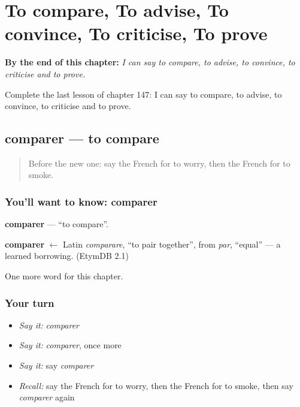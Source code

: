 
\chapter{To compare, To advise, To convince, To criticise, To prove}
\label{ch:fr-to-compare-to-advise-to-convince-to-criticise-to-prove}

\begin{chapteropening}
\textbf{By the end of this chapter:} \emph{I can say to compare, to advise, to convince, to criticise and to prove.}

Complete the last lesson of chapter 147: I can say to compare, to advise, to convince, to criticise and to prove.
\end{chapteropening}

\section[comparer]{comparer — to compare}

\label{lesson:FR-C147-comparer}



\begin{quote}
Before the new one: say the French for to worry, then the French for to smoke.
\end{quote}

\subsection*{You'll want to know: comparer}
\textbf{comparer} — \textquotedblleft{}to compare\textquotedblright{}.

\begin{cousinweb}
\textbf{comparer} $\leftarrow$ Latin \emph{comparare}, \textquotedblleft{}to pair together\textquotedblright{}, from \emph{par}, \textquotedblleft{}equal\textquotedblright{} — a learned borrowing. (EtymDB 2.1)
\end{cousinweb}

\begin{grammarlens}[title={What you've built}]
One more word for this chapter.
\end{grammarlens}

\subsection*{Your turn}
\begin{itemize}
\raggedright
  \item \emph{Say it:} \emph{comparer}
  \item \emph{Say it:} \emph{comparer}, once more
  \item \emph{Say it:} say \emph{comparer}
  \item \emph{Recall:} say the French for to worry, then the French for to smoke, then say \emph{comparer} again
\end{itemize}

